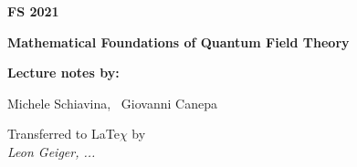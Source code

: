 \documentclass[12pt, twoside]{article}
\theoremstyle{note}
\begin{document}
\begin{titlepage}
   \begin{center}
       \vspace*{1cm}

       \textbf{\large FS 2021}

       \vspace{1.5cm}
       \textbf{\Huge Mathematical Foundations of Quantum Field Theory}

       \vspace{7.0cm}

       \textbf{Lecture notes by:}

       \vspace{0.3cm}

       {\large Michele Schiavina, \ Giovanni Canepa}

       \vfill

       Transferred to LaTe$\chi$ by\\
       \textit{Leon Geiger, ...}

       \vspace{0.8cm}




   \end{center}
\end{titlepage}

\newpage



\tableofcontents\thispagestyle{fancy}
\setcounter{page}{2}
\clearpage
{}
 \thispagestyle{fancy}
\end{document}
